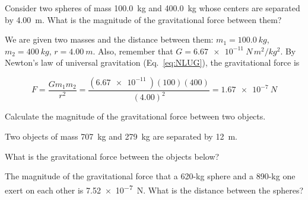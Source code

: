 \documentclass[main.tex]{subfiles}
\begin{document}
\begin{example}
Consider two spheres of mass \SI{100.0}{kg} and \SI{400.0}{kg} whose centers are separated by \SI{4.00}{m}. What is the magnitude of the gravitational force between them?
\vspace{1ex}

\Solution We are given two masses and the distance between them: $m_1 = \SI{100.0}{kg}$, $m_2 = \SI{400}{kg}$, $r = \SI{4.00}{m}$. Also, remember that $G = \SI{6.67e-11}{N\,m^2/kg^2}$. By Newton's law of universal gravitation (Eq.~\ref{eq:NLUG}), the gravitational force is

\begin{equation*}
    F = \frac{G m_1 m_2}{r^2} = 
    \frac{\left(\SI{6.67e-11}{}\right) \left(100\right) \left(400\right)}{\left(4.00\right)^2} = 
    \SI{1.67e-7}{N}
\end{equation*}
\end{example}

\cyanhrule
\vspace{2ex}

Calculate the magnitude of the gravitational force between two objects.

\begin{exercise} \label{9DkhbB}
Two objects of mass \SI{707}{kg} and \SI{279}{kg} are separated by \SI{12}{m}. 
\end{exercise}



\begin{exercise} \label{MMnbpt}
What is the gravitational force between the objects below?
\vspace{-2em}

\begin{center}
    \centering
\end{center}
\end{exercise}

\begin{example}
    The magnitude of the gravitational force that a 620-kg sphere and a 890-kg one exert on each other is \SI{7.52e-7}{N}. What is the distance between the spheres?
\end{example}
\end{document}
